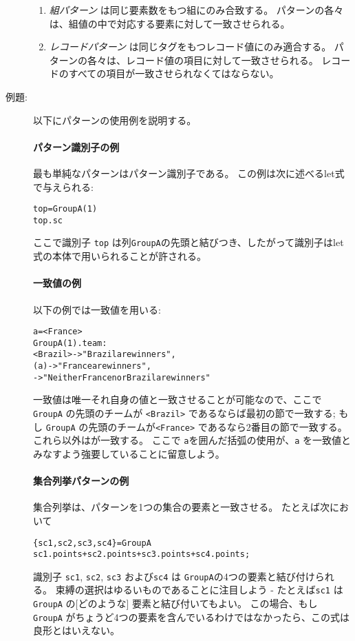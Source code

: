 \documentclass[\pformat,12pt]{jarticle}
\begin{document}
\begin{description}
\begin{enumerate}
  \item  {\it 組パターン} は同じ要素数をもつ組にのみ合致する。
 パターンの各々は、組値の中で対応する要素に対して一致させられる。

  \item  {\it レコードパターン} は同じタグをもつレコード値にのみ適合する。
  パターンの各々は、レコード値の項目に対して一致させられる。
 レコードのすべての項目が一致させられなくてはならない。
  \end{enumerate}

\item[例題:] 以下にパターンの使用例を説明する。

\paragraph{パターン識別子の例}
最も単純なパターンはパターン識別子である。
この例は次に述べるlet式で与えられる:
\begin{alltt}
   top = GroupA(1)
   top.sc
\end{alltt}
ここで識別子 \texttt{top} は列\texttt{GroupA}の先頭と結びつき、したがって識別子はlet式の本体で用いられることが許される。

\paragraph{一致値の例}
以下の例では一致値を用いる:
\begin{alltt}
   a = <France>
    GroupA(1).team:
             <Brazil> -> "Brazil are winners",
             (a)      -> "France are winners",
                 -> "Neither France nor Brazil are winners"
\end{alltt}
一致値は唯一それ自身の値と一致させることが可能なので、ここで \texttt{GroupA} の先頭のチームが \texttt{<Brazil>} であるならば最初の節で一致する; もし \texttt{GroupA} の先頭のチームが\texttt{<France>} であるなら2番目の節で一致する。
これら以外はが一致する。
ここで \texttt{a}を囲んだ括弧の使用が、\texttt{a} を一致値とみなすよう強要していることに留意しよう。

\paragraph{集合列挙パターンの例}
集合列挙は、パターンを1つの集合の要素と一致させる。
たとえば次において
\begin{alltt}
   \{sc1, sc2, sc3, sc4\} =  GroupA
   sc1.points + sc2.points + sc3.points + sc4.points;
\end{alltt}
識別子 \texttt{sc1}, \texttt{sc2}, \texttt{sc3} および\texttt{sc4} は \texttt{GroupA}の4つの要素と結び付けられる。
束縛の選択はゆるいものであることに注目しよう - たとえば\texttt{sc1} は\texttt{GroupA} の[どのような] 要素と結び付いてもよい。
この場合、もし \texttt{ GroupA} がちょうど4つの要素を含んでいるわけではなかったら、この式は良形とはいえない。


\end{description}
\end{document}
